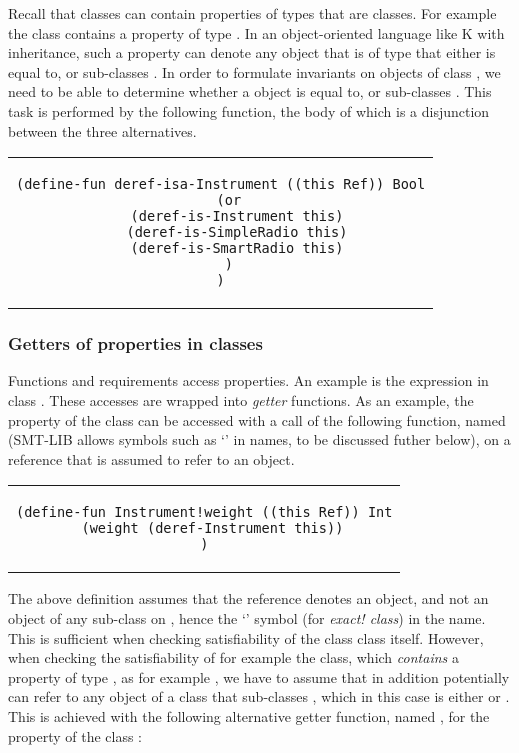 Recall that classes can contain properties of types that are
classes. For example the  class contains a 
property  of type . In an 
object-oriented language like K with inheritance, 
such a property can denote any object that is of type that either 
is equal to, or sub-classes . In order to 
formulate invariants on objects of class , 
we need to be able to determine whether a  object 
is equal to, or sub-classes . This task is performed by the following function, the body of which is a disjunction between the three alternatives.

\begin{center}
\begin{tabular}{c}
\begin{lstlisting}
(define-fun deref-isa-Instrument ((this Ref)) Bool
  (or
    (deref-is-Instrument this)
    (deref-is-SimpleRadio this)
    (deref-is-SmartRadio this)
  )
)
\end{lstlisting}
\end{tabular}
\end{center}

\subsubsection{Getters of properties in classes}

Functions and requirements access properties. An example is
the expression  in class .
These accesses are wrapped into {\em getter} functions. As an 
example, the  property of the class  
can be accessed with a call of the following function, named 
 (SMT-LIB allows symbols such as `\code{!}' 
in names, to be discussed futher below), on a reference that is 
assumed to refer to an  object.

\begin{center}
\begin{tabular}{c}
\begin{lstlisting}
(define-fun Instrument!weight ((this Ref)) Int
  (weight (deref-Instrument this))
)
\end{lstlisting}
\end{tabular}
\end{center}

The above definition assumes that the  reference denotes
an  object, and not an object of any sub-class on 
, hence the `\code{!}' symbol (for {\em exact! 
class}) in the name. 
This is sufficient when checking satisfiability 
of the class  class itself. However, when checking 
the satisfiability of for example the  class, 
which {\em contains} a property of type , as for 
example , we have to assume that 
 in addition potentially can refer to any object of a 
class that sub-classes , which in this case is 
either  or . This is achieved 
with the following alternative getter function, named 
, for the 
 property of the class :

